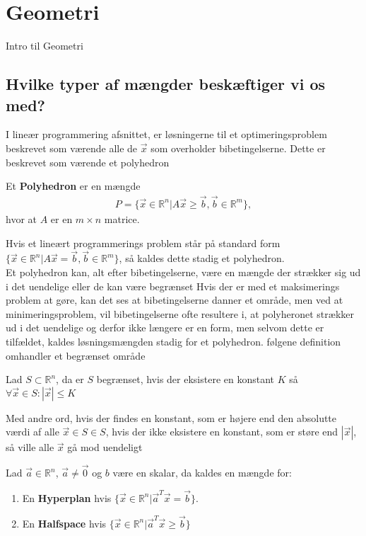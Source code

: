 \chapter{Geometri}
Intro til Geometri
\section{Hvilke typer af mængder beskæftiger vi os med?}
I lineær programmering afsnittet, er løsningerne til et optimeringsproblem beskrevet som værende alle de $\vec{x}$ som overholder bibetingelserne. Dette er beskrevet som værende et polyhedron
\begin{defn} [Polyhedron]
Et \textbf{Polyhedron} er en mængde 
\begin{align*}
 P =\{ \vec{x} \in \mathds{R}^n | A \vec{x} \geq \vec{b}, \vec{b}\in \mathds{R}^m\},
\end{align*}
hvor at $A$ er en $m \times n$ matrice.
\end{defn}
Hvis et lineært programmerings problem står på standard form $\{ \vec{x} \in \mathds{R}^n | A \vec{x} = \vec{b}, \vec{b}\in \mathds{R}^m\}$, så kaldes dette stadig et polyhedron.\\
Et polyhedron kan, alt efter bibetingelserne, være en mængde der strækker sig ud i det uendelige eller de kan være begrænset 
Hvis der er med et maksimerings problem at gøre, kan det ses at bibetingelserne danner et område, men ved at minimeringsproblem, vil bibetingelserne ofte resultere i, at polyheronet strækker ud i det uendelige og derfor ikke længere er en form, men selvom dette er tilfældet, kaldes løsningsmængden stadig for et polyhedron.
følgene definition omhandler et begrænset område
\begin{defn} [Begrænset]
Lad $S \subset \mathds{R}^n$, da er $S$ begrænset, hvis der eksistere en konstant $K$ så $\forall \vec{x} \in S: |\vec{x}| \leq K$
\end{defn}
Med andre ord, hvis der findes en konstant, som er højere end den absolutte værdi af alle $\vec{x} \in S \in S$, hvis der ikke eksistere en konstant, som er støre end $|\vec{x}|$, så ville alle $\vec{x}$ gå mod uendeligt

\begin{defn}
Lad $ \vec{a} \in \mathds{R}^n$, $\vec{a}\neq \vec{0}$ og $b$ være en skalar, da kaldes en mængde for:
\begin{enumerate}
\item En \textbf{Hyperplan} hvis $\{ \vec{x} \in \mathds{R}^n | \vec{a}^{T}\vec{x} = \vec{b}\}$.
\\ \item En \textbf{Halfspace} hvis $\{ \vec{x} \in \mathds{R}^n | \vec{a}^{T} \vec{x} \geq \vec{b}\}$
\end{enumerate}
\end{defn}

